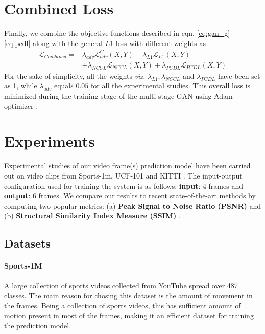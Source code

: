 \documentclass{article}
\begin{document}
\section{Combined Loss}
\label{sec:combloss}
Finally, we combine the objective functions described in eqn. \ref{eq:gan_g} - \ref{eq:pcdl} along with the general $ L1 $-loss with different weights as
\begin{equation}
	\begin{split}
	\mathcal{L}_{Combined} = & 	\lambda_{adv}\mathcal{L}_{adv}^G (X, Y) + \lambda_{L1} \mathcal{L}_{L1} (X, Y) \\
	& + \lambda_{NCCL} \mathcal{L}_{NCCL} (X, Y) + \lambda_{PCDL} \mathcal{L}_{PCDL} (X, Y)
	\end{split}
	\label{eq:combined}
\end{equation}
For the sake of simplicity, all the weights \textit{viz.} $\lambda_{L1}, \lambda_{NCCL} $ and $ \lambda_{PCDL} $ have been set as 1, while $ \lambda_{adv} $ equals $ 0.05 $ for all the experimental studies. This overall loss is minimized during the training stage of the multi-stage GAN using Adam optimizer \cite{kingma2014adam}. 

\section{Experiments}
  \label{sec:experiments}
  Experimental studies of our video frame(s) prediction model have been carried out on video clips from Sports-1m, UCF-101 \cite{soomro2012ucf101} and KITTI \cite{Geiger2013IJRR}. The input-output configuration used for training the system is as follows: \textbf{input}: 4 frames and \textbf{output}: 6 frames. We compare our results to recent state-of-the-art methods by computing two popular metrics: (a) \textbf{Peak Signal to Noise Ratio (PSNR)} and (b) \textbf{Structural Similarity Index Measure (SSIM)} \cite{wang2004image}.

\subsection{Datasets}
  \paragraph{Sports-1M} A large collection of sports videos collected from YouTube spread over 487 classes. The main reason for chosing this dataset is the amount of movement in the frames. Being a collection of sports videos, this has sufficient amount of motion present in most of the frames, making it an efficient dataset for training the prediction model.
\end{document}
